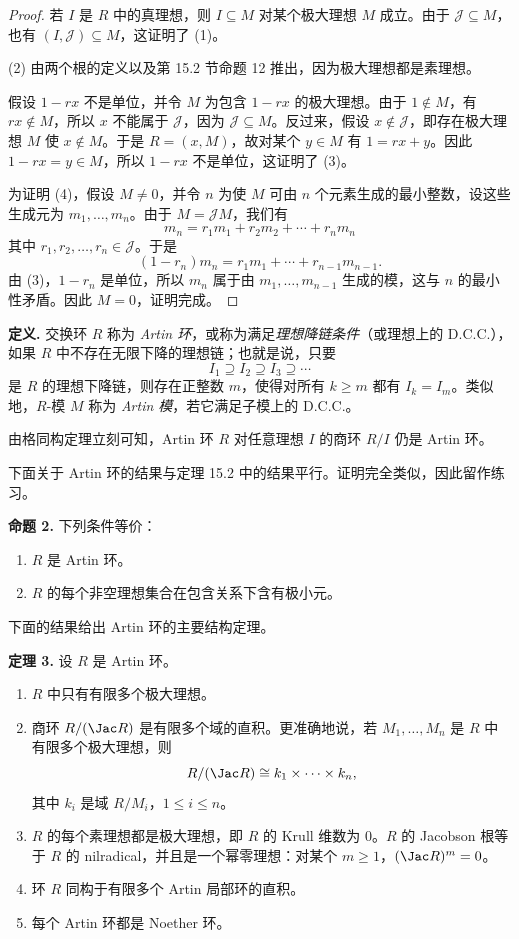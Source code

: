\begin{proof}
若 $I$ 是 $R$ 中的真理想，则 $I\subseteq M$ 对某个极大理想 $M$ 成立。由于 $\mathcal J\subseteq M$，也有 $(I,\mathcal J)\subseteq M$，这证明了 (1)。

(2) 由两个根的定义以及第 15.2 节命题 12 推出，因为极大理想都是素理想。

假设 $1-rx$ 不是单位，并令 $M$ 为包含 $1-rx$ 的极大理想。由于 $1\notin M$，有 $rx\notin M$，所以 $x$ 不能属于 $\mathcal J$，因为 $\mathcal J\subseteq M$。反过来，假设 $x\notin\mathcal J$，即存在极大理想 $M$ 使 $x\notin M$。于是 $R=(x,M)$，故对某个 $y\in M$ 有 $1=rx+y$。因此 $1-rx=y\in M$，所以 $1-rx$ 不是单位，这证明了 (3)。

为证明 (4)，假设 $M\neq0$，并令 $n$ 为使 $M$ 可由 $n$ 个元素生成的最小整数，设这些生成元为 $m_1,\ldots,m_n$。由于 $M=\mathcal JM$，我们有
\[
  m_n=r_1m_1+r_2m_2+\cdots+r_nm_n
\]
其中 $r_1,r_2,\ldots,r_n\in\mathcal J$。于是
\[
  (1-r_n)m_n=r_1m_1+\cdots+r_{n-1}m_{n-1}.
\]
由 (3)，$1-r_n$ 是单位，所以 $m_n$ 属于由 $m_1,\ldots,m_{n-1}$ 生成的模，这与 $n$ 的最小性矛盾。因此 $M=0$，证明完成。
\end{proof}

\noindent\textbf{定义.} 交换环 $R$ 称为 \emph{Artin 环}，或称为满足\emph{理想降链条件}（或理想上的 D.C.C.），如果 $R$ 中不存在无限下降的理想链；也就是说，只要
\[
  I_1\supseteq I_2\supseteq I_3\supseteq\cdots
\]
是 $R$ 的理想下降链，则存在正整数 $m$，使得对所有 $k\geq m$ 都有 $I_k=I_m$。类似地，$R$-模 $M$ 称为 \emph{Artin 模}，若它满足子模上的 D.C.C.。

由格同构定理立刻可知，Artin 环 $R$ 对任意理想 $I$ 的商环 $R/I$ 仍是 Artin 环。

下面关于 Artin 环的结果与定理 15.2 中的结果平行。证明完全类似，因此留作练习。

\medskip
\noindent\textbf{命题 2.} 下列条件等价：
\begin{enumerate}[label=(\arabic*)]
  \item $R$ 是 Artin 环。
  \item $R$ 的每个非空理想集合在包含关系下含有极小元。
\end{enumerate}

下面的结果给出 Artin 环的主要结构定理。

\medskip
\noindent\textbf{定理 3.} 设 $R$ 是 Artin 环。
\begin{enumerate}[label=(\arabic*)]
  \item $R$ 中只有有限多个极大理想。
  \item 商环 $R/(\Jac R)$ 是有限多个域的直积。更准确地说，若 $M_1,\ldots,M_n$ 是 $R$ 中有限多个极大理想，则
  \[
    R/(\Jac R)\cong k_1\times\cdots\times k_n,
  \]
  其中 $k_i$ 是域 $R/M_i$，$1\leq i\leq n$。
  \item $R$ 的每个素理想都是极大理想，即 $R$ 的 Krull 维数为 $0$。$R$ 的 Jacobson 根等于 $R$ 的 nilradical，并且是一个幂零理想：对某个 $m\geq1$，$(\Jac R)^m=0$。
  \item 环 $R$ 同构于有限多个 Artin 局部环的直积。
  \item 每个 Artin 环都是 Noether 环。
\end{enumerate}

